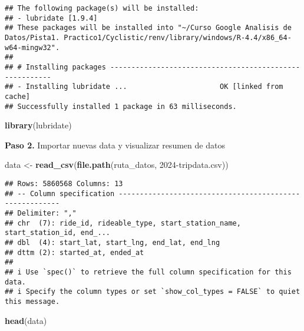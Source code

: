 \documentclass[
]{article}
\newenvironment{Shaded}{\begin{snugshade}}{\end{snugshade}}
\newcommand{\FunctionTok}[1]{\textcolor[rgb]{0.13,0.29,0.53}{\textbf{#1}}}
\newcommand{\NormalTok}[1]{#1}
\newcommand{\OtherTok}[1]{\textcolor[rgb]{0.56,0.35,0.01}{#1}}
\newcommand{\StringTok}[1]{\textcolor[rgb]{0.31,0.60,0.02}{#1}}
\begin{document}
\begin{verbatim}
## The following package(s) will be installed:
## - lubridate [1.9.4]
## These packages will be installed into "~/Curso Google Analisis de Datos/Pista1. Practico1/Cyclistic/renv/library/windows/R-4.4/x86_64-w64-mingw32".
## 
## # Installing packages --------------------------------------------------------
## - Installing lubridate ...                      OK [linked from cache]
## Successfully installed 1 package in 63 milliseconds.
\end{verbatim}

\begin{Shaded}
\begin{Highlighting}[]
\FunctionTok{library}\NormalTok{(lubridate)}
\end{Highlighting}
\end{Shaded}

\hfill\break
\textbf{Paso 2.} Importar nuevas data y visualizar resumen de datos

\begin{Shaded}
\begin{Highlighting}[]
\NormalTok{data }\OtherTok{\textless{}{-}} \FunctionTok{read\_csv}\NormalTok{(}\FunctionTok{file.path}\NormalTok{(ruta\_datos, }\StringTok{\textquotesingle{}2024{-}tripdata.csv\textquotesingle{}}\NormalTok{))}
\end{Highlighting}
\end{Shaded}

\begin{verbatim}
## Rows: 5860568 Columns: 13
## -- Column specification --------------------------------------------------------
## Delimiter: ","
## chr  (7): ride_id, rideable_type, start_station_name, start_station_id, end_...
## dbl  (4): start_lat, start_lng, end_lat, end_lng
## dttm (2): started_at, ended_at
## 
## i Use `spec()` to retrieve the full column specification for this data.
## i Specify the column types or set `show_col_types = FALSE` to quiet this message.
\end{verbatim}

\begin{Shaded}
\begin{Highlighting}[]
\FunctionTok{head}\NormalTok{(data)}
\end{Highlighting}
\end{Shaded}
\end{document}

